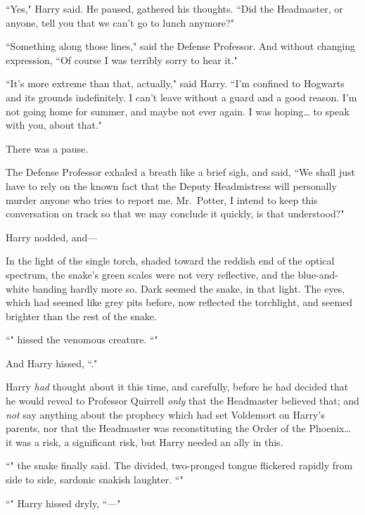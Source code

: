 ``Yes," Harry said. He paused, gathered his thoughts. ``Did the Headmaster, or anyone, tell you that we can't go to lunch anymore?"

``Something along those lines," said the Defense Professor. And without changing expression, ``Of course I was terribly sorry to hear it."

``It's more extreme than that, actually," said Harry. ``I'm confined to Hogwarts and its grounds indefinitely. I can't leave without a guard and a good reason. I'm not going home for summer, and maybe not ever again. I was hoping{\ldots} to speak with you, about that."

There was a pause.

The Defense Professor exhaled a breath like a brief sigh, and said, ``We shall just have to rely on the known fact that the Deputy Headmistress will personally murder anyone who tries to report me. Mr.~Potter, I intend to keep this conversation on track so that we may conclude it quickly, is that understood?"

Harry nodded, and---

In the light of the single torch, shaded toward the reddish end of the optical spectrum, the snake's green scales were not very reflective, and the blue-and-white banding hardly more so. Dark seemed the snake, in that light. The eyes, which had seemed like grey pits before, now reflected the torchlight, and seemed brighter than the rest of the snake.

``" hissed the venomous creature. ``"

And Harry hissed, ``."

Harry \emph{had} thought about it this time, and carefully, before he had decided that he would reveal to Professor Quirrell \emph{only} that the Headmaster believed that; and \emph{not} say anything about the prophecy which had set Voldemort on Harry's parents, nor that the Headmaster was reconstituting the Order of the Phoenix{\ldots} it was a risk, a significant risk, but Harry needed an ally in this.

``" the snake finally said. The divided, two-pronged tongue flickered rapidly from side to side, sardonic snakish laughter. ``"

``" Harry hissed dryly, ``---"

